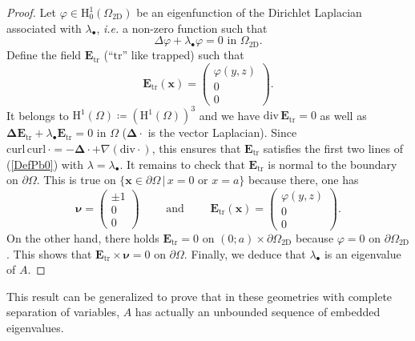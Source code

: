 \documentclass[11pt,a4paper]{article}
\newcommand{\Om}{\Omega}
\newcommand{\mrm}[1]{\mathrm{#1}}
\newcommand{\bfx}{\boldsymbol{x}}
\newcommand{\bfnu}{\boldsymbol{\nu}}
\newcommand{\mH}{\mrm{H}}
\newcommand{\curlvec}{\boldsymbol{\mrm{curl}}\,}
\renewcommand{\div}{\mrm{div}}
\def\E{\boldsymbol{E}}
\begin{document}
\begin{proof}
Let $\varphi\in\mH^1_0(\Om_{\mrm{2D}})$ be an eigenfunction of the Dirichlet Laplacian associated with $\lambda_\bullet$, \textit{i.e.} a non-zero function such that
\begin{equation}\label{PbForPhi}
\Delta\varphi+\lambda_\bullet\varphi=0\mbox{ in }\Om_{\mrm{2D}}.
\end{equation}
Define the field $\E_{\mrm{tr}}$ (``$\mrm{tr}$'' like trapped) such that
\begin{equation}\label{DefEtr1}
\E_{\mrm{tr}}(\bfx)=\left(\begin{array}{c}
\varphi(y,z)\\
0\\
0
\end{array}\right).
\end{equation}
It belongs to $\boldsymbol{\mH}^1(\Om)\coloneqq(\mH^1(\Om))^3$ and we have $\div\,\E_{\mrm{tr}}=0$ as well as $\boldsymbol{\Delta} \E_{\mrm{tr}}+\lambda_\bullet\E_{\mrm{tr}}=0$ in $\Om$ ($\boldsymbol{\Delta}\cdot$ is the vector Laplacian). Since $\curlvec\curlvec\cdot=-\boldsymbol{\Delta}\cdot+\nabla(\div\cdot)$, this ensures that $\E_{\mrm{tr}}$ satisfies the first two lines of (\ref{DefPb0}) with $\lambda=\lambda_{\bullet}$. It remains to check that $\E_{\mrm{tr}}$ is normal to the boundary on $\partial\Om$. This is true on $\{\bfx\in\partial\Om\,|\,x=0\mbox{ or }x=a\}$ because there, one has
\[
\bfnu=\left(\begin{array}{c}
\pm1\\
0\\
0
\end{array}\right)\qquad\mbox{ and }\qquad
\E_{\mrm{tr}}(\bfx)=\left(\begin{array}{c}
\varphi(y,z)\\
0\\
0
\end{array}\right).
\]
On the other hand, there holds $
\E_{\mrm{tr}}=0\mbox{ on }(0;a)\times\partial\Om_{\mrm{2D}}$ because $\varphi=0$ on $\partial\Om_{\mrm{2D}}$. This shows that $\E_{\mrm{tr}}\times\bfnu=0$ on $\partial\Om$. Finally, we deduce that $\lambda_\bullet$ is an eigenvalue of $A$. 
\end{proof}
\noindent This result can be generalized to prove that in these geometries with complete separation of variables, $A$ has actually an unbounded sequence of embedded eigenvalues.
\end{document}
